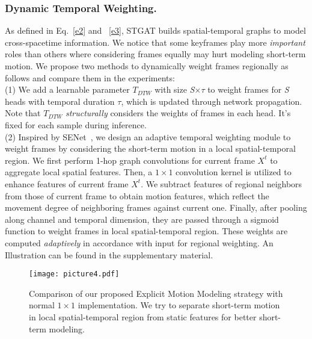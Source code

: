 \documentclass[runningheads]{llncs}
\begin{document}
\subsubsection{Dynamic Temporal Weighting.}
As defined in Eq.~\ref{e2} and ~\ref{e3}, STGAT builds spatial-temporal graphs to model cross-spacetime information. We notice that some keyframes play more \textit{important} roles than others where considering frames equally may hurt modeling short-term motion. We propose two methods to dynamically weight frames regionally as follows and compare them in the experiments:\\
(1) We add a learnable parameter $T_{DTW}$ with size \textit{S}$\times\tau$ to weight frames for \textit{S} heads with temporal duration $\tau$, which is updated through network propagation. Note that $T_{DTW}$ \textit{structurally} considers the weights of frames in each head. It's fixed for each sample during inference.\\
(2) Inspired by SENet~\cite{hu2018squeeze}, we design an adaptive temporal weighting module to weight frames by considering the short-term motion in a local spatial-temporal region. We first perform 1-hop graph convolutions for current frame $X^{t}$ to aggregate local spatial features. Then, a $1\times 1$ convolution kernel is utilized to enhance features of current frame $X^{t}$. We subtract features of regional neighbors from those of current frame to obtain motion features, which reflect the movement degree of neighboring frames against current one. Finally, after pooling along channel and temporal dimension, they are passed through a sigmoid function to weight frames in local spatial-temporal region. These weights are computed \textit{adaptively} in accordance with input for regional weighting. An Illustration can be found in the supplementary material.
\begin{figure}[t]
\centering
\texttt{[image: picture4.pdf]} 
\caption{ Comparison of our proposed Explicit Motion Modeling strategy with normal $1\times 1$ implementation. We try to separate short-term motion in local spatial-temporal region from static features for better short-term modeling.}
\label{fig4}
\end{figure}
\end{document}
